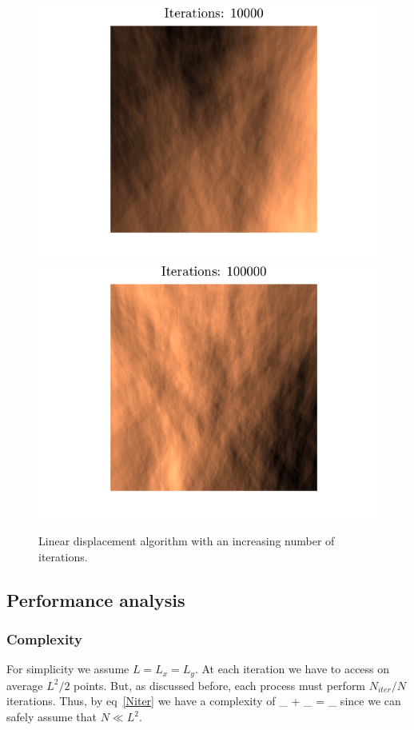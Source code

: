 \begin{figure}[h]
    \centering
    \includegraphics[width=\linewidth]{img/lines1e4.png}
\endminipage\hfill
{}
    \centering
    \includegraphics[width=\linewidth]{img/lines1e5.png}
\endminipage\hfill

\caption{\label{liter}Linear displacement algorithm with an increasing number of iterations.}
\end{figure}

\subsection{Performance analysis}
\subsubsection{Complexity}
For simplicity we assume $L = L_x = L_y$.
At each iteration we have to access on average $L^2/2$ points.
But, as discussed before, each process must perform $N_{iter}/N$ iterations.
Thus, by eq~\ref{Niter} we have a complexity of 
\be
    _{} + _{} = _{}
\ee
since we can safely assume that $N\ll L^2$. 

